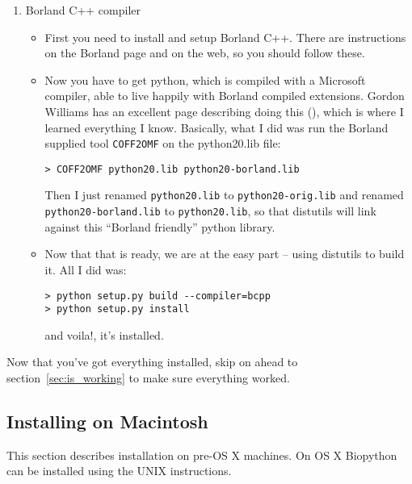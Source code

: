 \documentclass{article}
\begin{document}
\begin{enumerate}
  \item Borland C++ compiler

\begin{itemize}
  \item First you need to install and setup Borland C++. There are instructions on the Borland page and on the web, so you should follow these.
 
  \item Now you have to get python, which is compiled with a Microsoft compiler, able to live happily with Borland compiled extensions. Gordon Williams has an excellent page describing doing this (), which is where I learned everything I know. Basically, what I did was run the Borland supplied tool \verb|COFF2OMF| on the python20.lib file:

\begin{verbatim}
> COFF2OMF python20.lib python20-borland.lib
\end{verbatim}

Then I just renamed \verb|python20.lib| to \verb|python20-orig.lib| and renamed \verb|python20-borland.lib| to \verb|python20.lib|, so that distutils will link against this ``Borland friendly'' python library.

  \item Now that that is ready, we are at the easy part -- using distutils to build it. All I did was:

\begin{verbatim}
> python setup.py build --compiler=bcpp
> python setup.py install
\end{verbatim}

and voila!, it's installed. 

\end{itemize}

\end{enumerate}

Now that you've got everything installed, skip on ahead to section~\ref{sec:is_working} to make sure everything worked.

\subsection{Installing on Macintosh}

This section describes installation on pre-OS X machines. On OS X
Biopython can be installed using the UNIX instructions.
\end{document}
